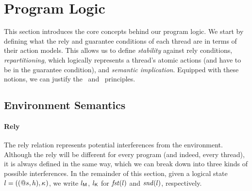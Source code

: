 \section{\colosl Program Logic}\label{sec:semantics}
This section introduces the core concepts behind our program logic. We start by defining what the rely and guarantee conditions of each thread are in terms of their action models. This allows us to define \emph{stability} against rely conditions, \emph{repartitioning}, which logically represents a thread's atomic actions (and have to be in the guarantee condition), and \emph{semantic implication}. Equipped with these notions, we can justify the \shiftRule\ and \extendRule\ principles. 
%
%
\subsection{Environment Semantics}
\paragraph{\textbf{Rely}}
The rely relation represents potential interferences from the environment. Although the rely will be different for every program (and indeed, every thread), it is always defined in the same way, which we can break down into three kinds of possible interferences. In the remainder of this section, given a logical state $l = ((@s, h),\kappa_{})$, we write $l_{\mathsf{M}}$, $l_{\mathsf{K}}$ for $\mathit{fst}(l)$ and $\mathit{snd}(l)$, respectively.

